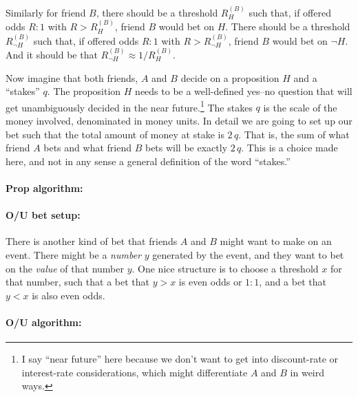 \documentclass{article}
\renewcommand{\not}{\neg}
\begin{document}
Similarly for friend $B$, there should be a threshold $R_H^{(B)}$ such that, if offered odds $R:1$ with $R>R_H^{(B)}$, friend $B$ would bet on $H$.
There should be a threshold $R_{\not H}^{(B)}$ such that, if offered odds $R:1$ with $R>R_{\not H}^{(B)}$, friend $B$
would bet on $\not H$.
And it should be that $R_{\not H}^{(B)} \approx 1/R_H^{(B)}$.

Now imagine that both friends, $A$ and $B$ decide on a proposition $H$ and a ``stakes'' $q$.
The proposition $H$ needs to be a well-defined yes--no question that will get unambiguously decided in the near future.\footnote{%
I say ``near future'' here because we don't want to get into discount-rate or interest-rate considerations,
which might differentiate $A$ and $B$ in weird ways.}
The stakes $q$ is the scale of the money involved, denominated in money units.
In detail we are going to set up our bet such that the total amount of money at stake is $2\,q$.
That is, the sum of what friend $A$ bets and what friend $B$ bets will be exactly $2\,q$.
This is a choice made here, and not in any sense a general definition of the word ``stakes.''

\paragraph{Prop algorithm:}

\paragraph{O/U bet setup:}
There is another kind of bet that friends $A$ and $B$ might want to make on an event.
There might be a \emph{number} $y$ generated by the event, and they want to bet on the \emph{value} of that number $y$.
One nice structure is to choose a threshold $x$ for that number, such that a bet that $y>x$ is even odds or $1:1$, and
a bet that $y<x$ is also even odds.

\paragraph{O/U algorithm:}
\end{document}
